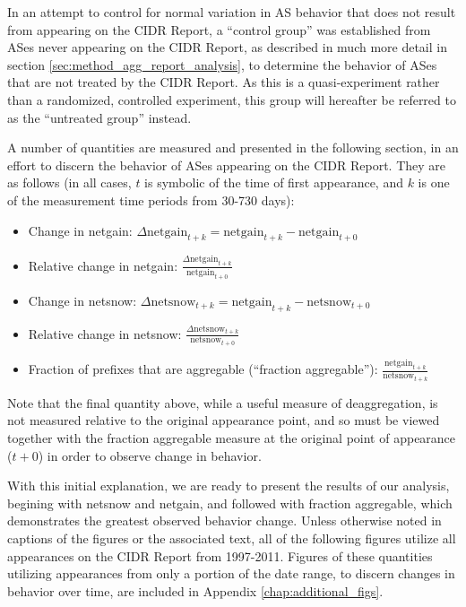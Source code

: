 In an attempt to control for normal variation in AS behavior that does not
result from appearing on the CIDR Report, a ``control group'' was established
from ASes never appearing on the CIDR Report, as described in much more detail
in section \ref{sec:method_agg_report_analysis}, to determine the behavior of
ASes that are not treated by the CIDR Report. As this is a quasi-experiment
rather than a randomized, controlled experiment, this group will hereafter be
referred to as the ``untreated group'' instead.

A number of quantities are measured and presented in the following section, in
an effort to discern the behavior of ASes appearing on the CIDR Report. They
are as follows (in all cases, $t$ is symbolic of the time of first appearance,
and $k$ is one of the measurement time periods from 30-730 days):
\begin{itemize}
\item{Change in netgain: $\Delta\textrm{netgain}_{t+k} = \textrm{netgain}_{t+k}
    - \textrm{netgain}_{t+0}$}
\item{Relative change in netgain: $\frac{\Delta\textrm{netgain}_{t+k}}
    {\textrm{netgain}_{t+0}}$}
\item{Change in netsnow: $\Delta\textrm{netsnow}_{t+k} = \textrm{netgain}_{t+k}
    - \textrm{netsnow}_{t+0}$}
\item{Relative change in netsnow: $\frac{\Delta\textrm{netsnow}_{t+k}}
    {\textrm{netsnow}_{t+0}}$}
\item{Fraction of prefixes that are aggregable (``fraction aggregable''):
    $\frac{\textrm{netgain}_{t+k}} {\textrm{netsnow}_{t+k}}$}
\end{itemize}

Note that the final quantity above, while a useful measure of deaggregation,
is not measured relative to the original appearance point, and so must be
viewed together with the fraction aggregable measure at the original point of
appearance ($t+0$) in order to observe change in behavior.

With this initial explanation, we are ready to present the results of our
analysis, begining with netsnow and netgain, and followed with fraction
aggregable, which demonstrates the greatest observed behavior change. Unless
otherwise noted in captions of the figures or the associated text, all of the
following figures utilize all appearances on the CIDR Report from 1997-2011.
Figures of these quantities utilizing appearances from only a portion of the
date range, to discern changes in behavior over time, are included in Appendix
\ref{chap:additional_figs}.

